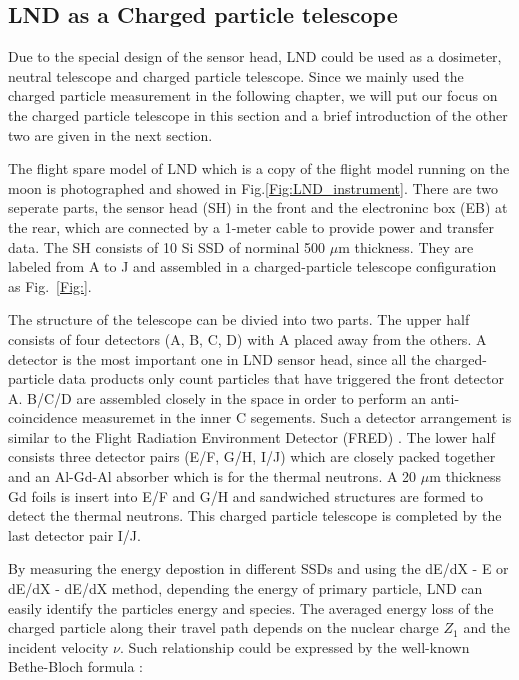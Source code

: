 \subsection{LND as a Charged particle telescope}

Due to the special design of the sensor head, \ac{LND} could be used as a dosimeter, neutral telescope and charged particle telescope. Since we mainly used the charged particle measurement in the following chapter, we will put our focus on the charged particle telescope in this section and a brief introduction of the other two are given in the next section.

The flight spare model of \ac{LND} which is a copy of the flight model running on the moon is photographed and showed in Fig.\ref{Fig:LND_instrument}. There are two seperate parts, the sensor head (SH) in the front and the electroninc box (EB) at the rear, which are connected by a 1-meter cable to provide power and transfer data. 
The SH consists of 10 Si \acs{SSD} of norminal 500 $\mu$m thickness. They are labeled from A to J and assembled in a charged-particle telescope configuration as Fig.~\ref{Fig:}.

The structure of the telescope can be divied into two parts. The upper half consists of four detectors (A, B, C, D) with A placed away from the others. A detector is the most important one in \ac{LND} sensor head, since all the charged-particle data products only count particles that have triggered the front detector A. B/C/D are assembled closely in the space in order to perform an anti-coincidence measuremet in the inner C segements. Such a detector arrangement is similar to the Flight Radiation Environment Detector (FRED) \citep{moeller-etal-2013, moeller-etal-2013b}. The lower half consists three detector pairs (E/F, G/H, I/J) which are closely packed together and an Al-Gd-Al absorber which is for the thermal neutrons. A 20 $\mu$m thickness Gd foils is insert into E/F and G/H and sandwiched structures are formed to detect the thermal neutrons. This charged particle telescope is completed by the last detector pair I/J.

By measuring the energy depostion in different \acp{SSD} and using the dE/dX - E or dE/dX - dE/dX method, depending the energy of primary particle, LND can easily identify the particles energy and species. 
The averaged energy loss of the charged particle along their travel path depends on the nuclear charge $Z_1$ and the incident velocity $\nu$. 
Such relationship could be expressed by the well-known Bethe-Bloch formula \citep{bethe-1930, bloch-1933}:

